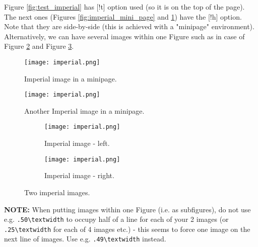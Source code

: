 Figure \ref{fig:test_imperial} has [!t] option used (so it is on the top of the page). The next ones (Figures \ref{fig:imperial_mini_page} and \ref{fig:imperial_mini_page_again}) have the [!h] option. Note that they are side-by-side (this is achieved with a "minipage" environment). Alternatively, we can have several images within one Figure such as in case of Figure \ref{fig:imperial_image_left} and Figure \ref{fig:imperial_image_right}.

\begin{figure}[!h]
	\begin{centering}
		\begin{minipage}{.60\textwidth}
			\begin{centering}
				\texttt{[image: imperial.png]}
				\caption{Imperial image in a minipage.}
				\label{fig:imperial_mini_page}
			\end{centering}
		\end{minipage}
		\begin{minipage}{.40\textwidth}
			\begin{centering}
				\texttt{[image: imperial.png]}
				\caption{Another Imperial image in a minipage.}
				\label{fig:imperial_mini_page_again}
			\end{centering}
		\end{minipage}
	\end{centering}
\end{figure}

\begin{figure*}[!h]
	\begin{subfigure}[b]{.49\textwidth}
		\centering
		\texttt{[image: imperial.png]}
		\caption{Imperial image - left.}
		\label{fig:imperial_image_left}
	\end{subfigure}
	\begin{subfigure}[b]{.49\textwidth}
		\centering
		\texttt{[image: imperial.png]}
		\caption{Imperial image - right.}
		\label{fig:imperial_image_right}
	\end{subfigure}
	
	\caption{Two imperial images.}
	\label{fig:two_imperial_images}
\end{figure*}

\textbf{NOTE:} When putting images within one Figure (i.e. as subfigures), do not use e.g. \verb|.50\textwidth| to occupy half of a line for each of your 2 images (or \verb|.25\textwidth| for each of 4 images etc.) - this seems to force one image on the next line of images. Use e.g. \verb|.49\textwidth| instead.